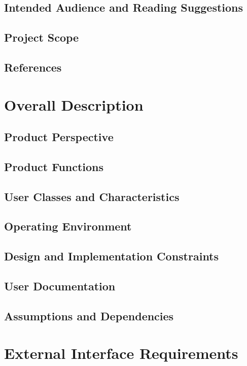 \documentclass{scrreprt}
\begin{document}
\section{Intended Audience and Reading Suggestions}

\section{Project Scope}

\section{References}

\chapter{Overall Description}

\section{Product Perspective}

\section{Product Functions}

\section{User Classes and Characteristics}

\section{Operating Environment}

\section{Design and Implementation Constraints}

\section{User Documentation}

\section{Assumptions and Dependencies}

\chapter{External Interface Requirements}
\end{document}
